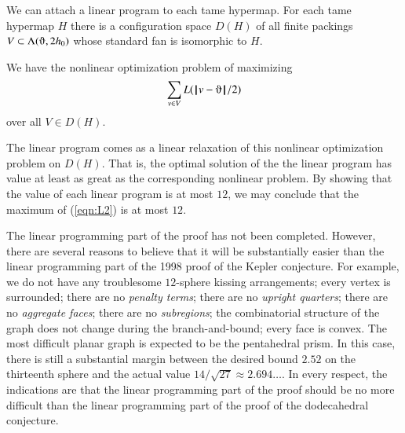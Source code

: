 We can attach a linear program to each tame hypermap.
For each tame hypermap $H$ there is a configuration space $D(H)$ of all
finite packings $V\subset \Lambda(\orgn,2\hm)$ whose standard fan is
isomorphic to $H$.

We have the nonlinear optimization problem of maximizing
\begin{equation}\label{eqn:L2}
\sum_{v\in V} L(\norm{v}{\orgn}/2)
\end{equation}
over all $V\in D(H)$.

The linear program comes as a linear relaxation of this nonlinear
optimization problem on $D(H)$. That is, the optimal solution of the
the linear program has value at least as great as the corresponding
nonlinear problem.  By showing that the value of each linear program
is at most $12$, we may conclude that the maximum of (\ref{eqn:L2})
is at most $12$.


\begin{note}%
The linear programming part of the proof has not been completed.  However, there are several reasons to believe that it will be substantially easier than the linear programming part of the 1998 proof of the Kepler conjecture.  For example, we do not have any troublesome $12$-sphere kissing arrangements; every vertex is surrounded; there are no {\it penalty terms}; there are no {\it upright quarters}; there are no {\it aggregate faces}; there are no {\it subregions}; the combinatorial structure of the graph does not change during the branch-and-bound; every face is convex.  The most difficult planar graph is expected to be the pentahedral prism.  In this case, there is still a substantial margin between the desired bound $2.52$ on the thirteenth sphere and the actual value $14/\sqrt{27}\approx 2.694\ldots$.  In every respect, the indications are that the linear programming part of the proof should be no more difficult than the linear programming part of the proof of the dodecahedral conjecture.
\end{note}